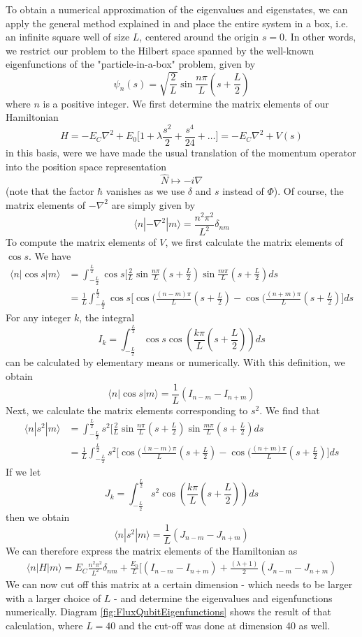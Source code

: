 \documentclass[a4paper, draft]{article}
\theoremstyle{own}
\theoremstyle{remark}
\begin{document}
To obtain a numerical approximation of the eigenvalues and eigenstates, we can apply the general method explained in \cite{JelicMarsiglio} and place the entire system in a box, i.e. an infinite square well of size $L$, centered around the origin $s=0$. In other words, we restrict our problem to the Hilbert space spanned by the well-known eigenfunctions of the "particle-in-a-box" problem, given by
$$
\psi_n(s) = \sqrt{\frac{2}{L}} \sin \frac{n\pi}{L} (s + \frac{L}{2})
$$ 
where $n$ is a positive integer. We first determine the matrix elements of our Hamiltonian
$$
H = - E_C  \nabla^2 + E_0 \big[ 1 + \lambda \frac{s^2}{2} + \frac{s^4}{24} + \dots \big]  = - E_C  \nabla^2 + V(s)
$$
in this basis, were we have made the usual translation of the momentum operator into the position space representation
$$
\hat{N} \mapsto -i \nabla
$$
(note that the factor $\hbar$ vanishes as we use $\delta$ and $s$ instead of $\Phi$). Of course, the matrix elements of $-\nabla^2$ are simply given by
$$
\langle n | - \nabla^2  | m \rangle = \frac{n^2 \pi^2}{L^2} \delta_{nm}
$$
To compute the matrix elements of $V$, we first calculate the matrix elements of $\cos s$. We have
\begin{align*}
\langle n | \cos s | m \rangle &= 
\int_{-\frac{L}{2}}^{\frac{L}{2}}
\cos s \big[ 
\frac{2}{L} \sin \frac{n\pi}{L} (s + \frac{L}{2})
\sin \frac{m\pi}{L} (s + \frac{L}{2})  ds \\
&= \frac{1}{L} \int_{-\frac{L}{2}}^{\frac{L}{2}} \cos s \big[ 
\cos (\frac{(n-m)\pi}{L} (s + \frac{L}{2}) 
-
\cos (\frac{(n+m)\pi}{L} (s + \frac{L}{2}) 
\big] ds
\end{align*}
For any integer $k$, the integral
$$
I_k = \int_{-\frac{L}{2}}^{\frac{L}{2}} \cos s \cos (\frac{k\pi}{L} (s + \frac{L}{2})) ds
$$
can be calculated by elementary means or numerically. With this definition, we obtain
$$
\langle n | \cos s | m \rangle = \frac{1}{L} (I_{n-m} - I_{n+m})
$$
Next, we calculate the matrix elements corresponding to $s^2$. We find that
\begin{align*}
\langle n | s^2 | m \rangle &= 
\int_{-\frac{L}{2}}^{\frac{L}{2}}
s^2 \big[ 
\frac{2}{L} \sin \frac{n\pi}{L} (s + \frac{L}{2})
\sin \frac{m\pi}{L} (s + \frac{L}{2})  ds \\
&= \frac{1}{L} \int_{-\frac{L}{2}}^{\frac{L}{2}} s^2 \big[ 
\cos (\frac{(n-m)\pi}{L} (s + \frac{L}{2}) 
-
\cos (\frac{(n+m)\pi}{L} (s + \frac{L}{2}) 
\big] ds
\end{align*}
If we let
$$
J_k = \int_{-\frac{L}{2}}^{\frac{L}{2}} s^2 \cos (\frac{k\pi}{L} (s + \frac{L}{2})) ds
$$
then we obtain
$$
\langle n | s^2 | m \rangle = \frac{1}{L} (J_{n-m} - J_{n+m})
$$
We can therefore express the matrix elements of the Hamiltonian as
\begin{align*}
\langle n | H | m \rangle = 
E_C \frac{n^2 \pi^2}{L^2} \delta_{nm} + \frac{E_0}{L} \big[ (I_{n-m} - I_{n+m})  + \frac{(\lambda + 1)}{2} (J_{n-m} - J_{n+m})
\end{align*}
We can now cut off this matrix at a certain dimension - which needs to be larger with a larger choice of $L$ - and determine the eigenvalues and eigenfunctions numerically. Diagram \ref{fig:FluxQubitEigenfunctions} shows the result of that calculation, where $L = 40$ and the cut-off was done at dimension 40 as well. 
\end{document}
